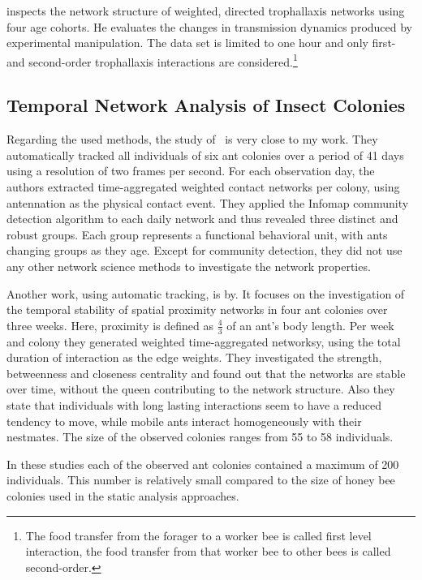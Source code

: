 
\textcite{naug2008structure} inspects the network structure of weighted, directed trophallaxis networks using four age cohorts. He evaluates the changes in transmission dynamics produced by experimental manipulation.
The data set is limited to one hour and only first- and second-order trophallaxis interactions are considered.\footnote{The food transfer from the forager to a worker bee is called first level interaction, the food transfer from that worker bee to other bees is called second-order.}


\subsection{Temporal Network Analysis of Insect Colonies}

Regarding the used methods, the study of~\textcite{mersch2013tracking} is very close to my work.
They automatically tracked all individuals of six ant colonies over a period of 41 days using a resolution of two frames per second.
For each observation day, the authors extracted time-aggregated weighted contact networks per colony, using antennation as the physical contact event.
They applied the Infomap community detection algorithm to each daily network and thus revealed three distinct and robust groups.
Each group represents a functional behavioral unit, with ants changing groups as they age.
Except for community detection, they did not use any other network science methods to investigate the network properties.


Another work, using automatic tracking, is by\textcite{jeanson2012long}.
It focuses on the investigation of the temporal stability of spatial proximity networks in four ant colonies over three weeks.
Here, proximity is defined as $\frac{4}{3}$ of an ant’s body length.
Per week and colony they generated weighted time-aggregated networksy,  using the total duration of interaction as the edge weights.
They investigated the strength, betweenness and closeness centrality and found out that the networks are stable over time, without the queen contributing to the network structure.
Also they state that individuals with long lasting interactions seem to have a reduced tendency to move, while mobile ants interact homogeneously with their nestmates.
The size of the observed colonies ranges from 55 to 58 individuals.


In these studies each of the observed ant colonies contained a maximum of 200 individuals. This number is relatively small compared to the size of honey bee colonies used in the static analysis approaches.